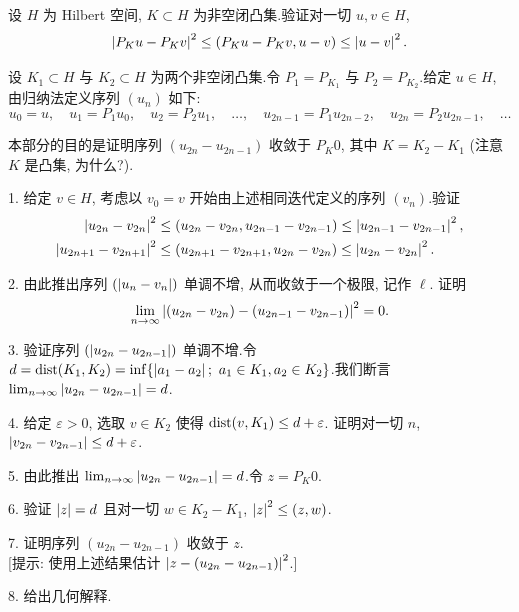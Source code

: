 \begin{problem}
\label{prob:27}
设 $H$ 为 Hilbert 空间, $K\subset H$ 为非空闭凸集.验证对一切 $u,v\in H$,
\begin{equation*}
\left|P_Ku-P_Kv\right|^2\le(P_Ku-P_Kv,u-v)\le\left|u-v\right|^2.
\end{equation*}

设 $K_1\subset H$ 与 $K_2\subset H$ 为两个非空闭凸集.令 $P_1=P_{K_1}$ 与
$P_2=P_{K_2}$.给定 $u\in H$, 由归纳法定义序列 $(u_n)$ 如下:
\begin{equation*}
u_0=u,\quad u_1=P_1u_0,\quad u_2=P_2u_1,\quad\dots,\quad u_{2n-1}=P_1u_{2n-2},\quad u_{2n}=P_2u_{2n-1},\quad\dots
\end{equation*}


本部分的目的是证明序列 $(u_{2n}-u_{2n-1})$ 收敛于 $P_K0$, 其中 $K=K_2-K_1$
(注意 $K$ 是凸集, 为什么?).

1. 给定 $v\in H$, 考虑以 $v_0=v$ 开始由上述相同迭代定义的序列 $(v_n)$.验证
\begin{align*}
\left|u_{2n}-v_{2n}\right|^2&\le(u_{2n}-v_{2n},u_{2n-1}-v_{2n-1})\le\left|u_{2n-1}-v_{2n-1}\right|^2,\\
\left|u_{2n+1}-v_{2n+1}\right|^2&\le(u_{2n+1}-v_{2n+1},u_{2n}-v_{2n})\le\left|u_{2n}-v_{2n}\right|^2.
\end{align*}

2. 由此推出序列 $(\left|u_n-v_n\right|)$ 单调不增, 从而收敛于一个极限, 记作 $\ell$.
证明
\begin{equation*}
\lim_{n\to\infty}\left|(u_{2n}-v_{2n})-(u_{2n-1}-v_{2n-1})\right|^2=0.
\end{equation*}

3. 验证序列 $(\left|u_{2n}-u_{2n-1}\right|)$ 单调不增.令
$d=\operatorname{dist}(K_1,K_2)=\inf\{\left|a_1-a_2\right|;\ a_1\in K_1,a_2\in K_2\}$.我们断言
$\lim_{n\to\infty}\left|u_{2n}-u_{2n-1}\right|=d$.

4. 给定 $\varepsilon>0$, 选取 $v\in K_2$ 使得 $\operatorname{dist}(v,K_1)\le d+\varepsilon$.
证明对一切 $n$, $\left|v_{2n}-v_{2n-1}\right|\le d+\varepsilon$.

5. 由此推出 $\lim_{n\to\infty}\left|u_{2n}-u_{2n-1}\right|=d$.令 $z=P_K0$.

6. 验证 $\left|z\right|=d$ 且对一切 $w\in K_2-K_1$, $\left|z\right|^2\le(z,w)$.

7. 证明序列 $(u_{2n}-u_{2n-1})$ 收敛于 $z$.\\
{[提示: 使用上述结果估计 $\left|z-(u_{2n}-u_{2n-1})\right|^2$.]}

8. 给出几何解释.



\end{problem}
